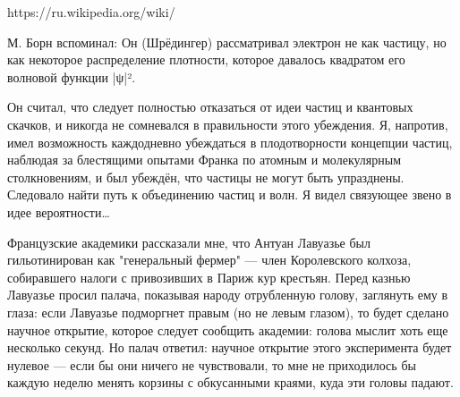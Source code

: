 https://ru.wikipedia.org/wiki/%
{
М. Борн вспоминал:
Он (Шрёдингер) рассматривал электрон не как частицу, но как некоторое распределение плотности, которое давалось квадратом его волновой функции |ψ|².

Он считал, что следует полностью отказаться от идеи частиц и квантовых скачков, и никогда не сомневался в правильности этого убеждения. Я, напротив, имел возможность каждодневно убеждаться в плодотворности концепции частиц, наблюдая за блестящими опытами Франка по атомным и молекулярным столкновениям, и был убеждён, что частицы не могут быть упразднены. Следовало найти путь к объединению частиц и волн. Я видел связующее звено в идее вероятности…
}


Французские академики рассказали мне, что Антуан Лавуазье был гильотинирован как "генеральный фермер" — член Королевского колхоза, собиравшего налоги с привозивших в Париж кур крестьян. Перед казнью Лавуазье просил палача, показывая народу отрубленную голову, заглянуть ему в глаза: если Лавуазье подморгнет правым (но не левым глазом), то будет сделано научное открытие, которое следует сообщить академии: голова мыслит хоть еще несколько секунд. 
Но палач ответил: научное открытие этого эксперимента будет нулевое — если бы они ничего не чувствовали, то мне не приходилось бы каждую неделю менять корзины с обкусанными краями, куда эти головы падают.


